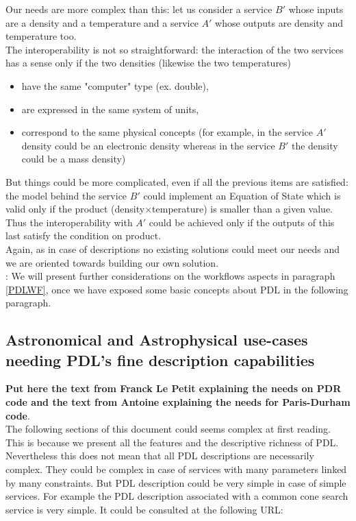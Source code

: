\documentclass[a4paper,11pt] {ivoa}
\begin{document}
Our needs are more complex than this: let us consider a service $B'$ whose inputs are a density and
a temperature and a service $A'$ whose outputs are density and temperature too. \\
The interoperability is not so straightforward: the interaction of the two services has a sense only
if the two densities (likewise the two temperatures)
\begin{itemize}
\item have the same "computer" type (ex. double),
\item are expressed in the same system of units,
\item correspond to the same physical concepts (for example, in the service $A'$ density could be
an electronic density whereas in the service $B'$ the density could be a mass density)
\end{itemize}
But things could be more complicated, even if all the previous items are satisfied: the model behind
the service $B'$ could implement an Equation of State which is valid only if the product
(density$\times$temperature) is smaller than a given value.
Thus the interoperability with $A'$ could be achieved only if the outputs of this last satisfy the
condition on product.\\

Again, as in case of descriptions no existing solutions could meet our needs and we are oriented
towards building our own solution.\\

: We will present further considerations on the workflows aspects in paragraph \ref{PDLWF}, once we have exposed some basic concepts about PDL in the following paragraph.  

\subsection{Astronomical and Astrophysical use-cases needing PDL's fine description capabilities}
{\bf Put here the text from Franck Le Petit explaining the needs on PDR code and the text from Antoine explaining the needs for Paris-Durham code}.\\

The following sections of this document could seems complex at first reading. This is because we present all the features and the descriptive richness  of PDL. Nevertheless this does  not mean that all PDL descriptions are necessarily complex. They could be complex in case of services with many parameters linked by many constraints. But PDL description could be very simple in case of simple services. 
For example the PDL description associated with a common cone search service is very simple. It could be consulted at the following URL:\\
\end{document}
